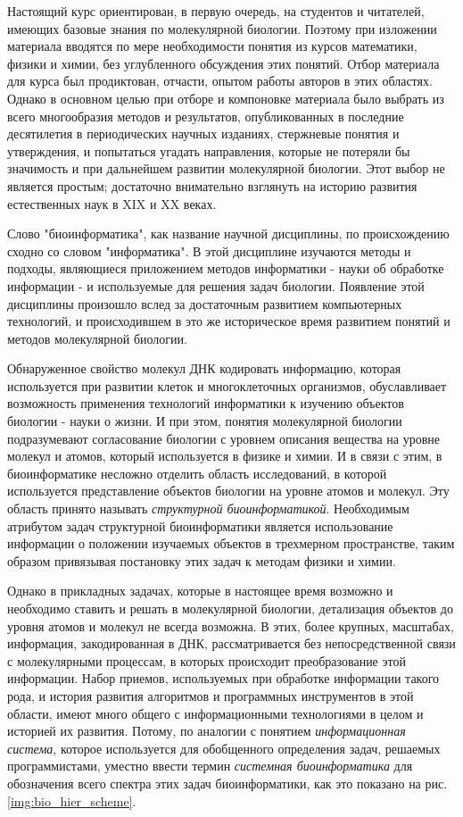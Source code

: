 \documentclass[a4paper,12pt,oneside,openany]{memoir}
\begin{document}
Настоящий курс ориентирован, в первую очередь, на студентов и читателей, имеющих базовые знания по молекулярной биологии. Поэтому при изложении материала вводятся по мере необходимости понятия из курсов математики, физики и химии, без углубленного обсуждения этих понятий. Отбор материала для курса был продиктован, отчасти, опытом работы авторов в этих областях. Однако в основном целью при отборе и компоновке материала было выбрать из всего многообразия методов и результатов, опубликованных в последние десятилетия в периодических научных изданиях, стержневые понятия и утверждения, и попытаться угадать направления, которые не потеряли бы значимость и при дальнейшем развитии молекулярной биологии. Этот выбор не является простым; достаточно внимательно взглянуть на историю развития естественных наук в XIX и XX веках. 

Слово "биоинформатика", как название научной дисциплины, по происхождению сходно со словом "информатика". В этой дисциплине изучаются методы и подходы, являющиеся приложением методов информатики - науки об обработке информации - и используемые для решения задач биологии. Появление этой дисциплины произошло вслед за достаточным развитием компьютерных технологий, и происходившем в это же историческое время развитием понятий и методов молекулярной биологии.

Обнаруженное свойство молекул ДНК кодировать информацию, которая используется при развитии клеток и многоклеточных организмов, обуславливает возможность применения технологий информатики к изучению объектов биологии - науки о жизни. И при этом, понятия молекулярной биологии подразумевают согласование биологии с уровнем описания вещества на уровне молекул и атомов, который используется в физике и химии. И в связи с этим, в биоинформатике несложно отделить область исследований, в которой используется представление объектов биологии на уровне атомов и молекул. Эту область принято называть \textit{структурной биоинформатикой}. Необходимым атрибутом задач структурной биоинформатики является использование информации о положении изучаемых объектов в трехмерном пространстве, таким образом привязывая постановку этих задач к методам физики и химии. 

Однако в прикладных задачах, которые в настоящее время возможно и необходимо ставить и решать в молекулярной биологии, детализация объектов до уровня атомов и молекул не всегда возможна. В этих, более крупных, масштабах, информация, закодированная в ДНК, рассматривается без непосредственной связи с молекулярными процессам, в которых происходит преобразование этой информации. Набор приемов, используемых при обработке информации такого рода, и история развития алгоритмов и программных инструментов в этой области, имеют много общего с информационными технологиями в целом и историей их развития. Потому, по аналогии с понятием \textit{информационная система}, которое используется для обобщенного определения задач, решаемых программистами, уместно ввести термин \textit{системная биоинформатика} для обозначения всего спектра этих задач биоинформатики, как это показано на рис. \ref{img:bio_hier_scheme}.
\end{document}
